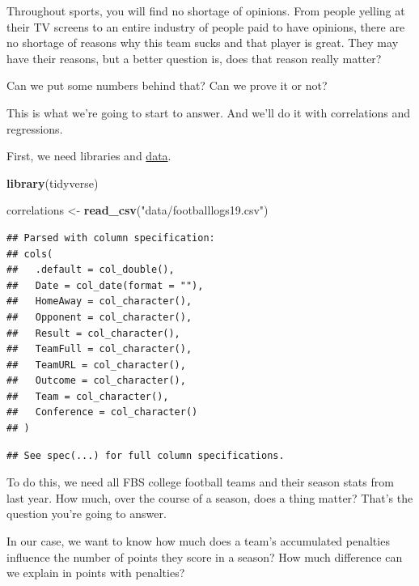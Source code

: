 \documentclass[
]{book}
\newenvironment{Shaded}{\begin{snugshade}}{\end{snugshade}}
\newcommand{\KeywordTok}[1]{\textcolor[rgb]{0.13,0.29,0.53}{\textbf{#1}}}
\newcommand{\NormalTok}[1]{#1}
\newcommand{\StringTok}[1]{\textcolor[rgb]{0.31,0.60,0.02}{#1}}
\begin{document}
Throughout sports, you will find no shortage of opinions. From people yelling at their TV screens to an entire industry of people paid to have opinions, there are no shortage of reasons why this team sucks and that player is great. They may have their reasons, but a better question is, does that reason really matter?

Can we put some numbers behind that? Can we prove it or not?

This is what we're going to start to answer. And we'll do it with correlations and regressions.

First, we need libraries and \href{https://unl.box.com/s/2prgq48ctoxlukn6kmfjw0u1opda5s0m}{data}.

\begin{Shaded}
\begin{Highlighting}[]
\KeywordTok{library}\NormalTok{(tidyverse)}
\end{Highlighting}
\end{Shaded}

\begin{Shaded}
\begin{Highlighting}[]
\NormalTok{correlations <-}\StringTok{ }\KeywordTok{read_csv}\NormalTok{(}\StringTok{"data/footballlogs19.csv"}\NormalTok{)}
\end{Highlighting}
\end{Shaded}

\begin{verbatim}
## Parsed with column specification:
## cols(
##   .default = col_double(),
##   Date = col_date(format = ""),
##   HomeAway = col_character(),
##   Opponent = col_character(),
##   Result = col_character(),
##   TeamFull = col_character(),
##   TeamURL = col_character(),
##   Outcome = col_character(),
##   Team = col_character(),
##   Conference = col_character()
## )
\end{verbatim}

\begin{verbatim}
## See spec(...) for full column specifications.
\end{verbatim}

To do this, we need all FBS college football teams and their season stats from last year. How much, over the course of a season, does a thing matter? That's the question you're going to answer.

In our case, we want to know how much does a team's accumulated penalties influence the number of points they score in a season? How much difference can we explain in points with penalties?
\end{document}

